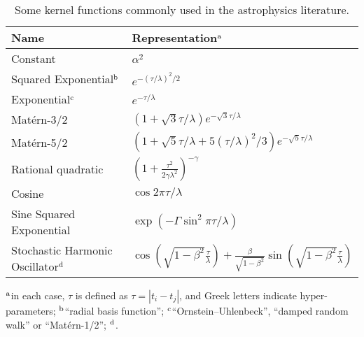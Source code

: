 \documentclass[letterpaper]{ar-1col}
\newcommand{\dt}{\ensuremath{\tau}}
\newcommand{\amplitude}{\ensuremath{\alpha}}
\newcommand{\lengthscale}{\ensuremath{\lambda}}
\begin{document}
\begin{table}[ht]
  \caption{Some kernel functions commonly used in the astrophysics literature. }
  \label{tab:kernels}
  \begin{center}
    \begin{tabular}{@{}l|l@{}}
      \hline
      Name                           &  Representation$^{\rm a}$                                    \\
      \hline
      Constant                       & $\amplitude^2$                                                     \\
      Squared Exponential$^{\rm b}$  & $e^{-(\dt/\lengthscale)^2/2}$                                              \\
      Exponential$^{\rm c}$          & $e^{-\dt/\lengthscale}$                                                  \\
      Mat\'ern-3/2                   & $\left(1 + \sqrt{3}\dt/\lengthscale\right)e^{-\sqrt{3}\dt/\lengthscale}$             \\
      Mat\'ern-5/2                   & $\left(1 + \sqrt{5}\dt/\lengthscale +5(\dt/\lengthscale)^2/3\right)e^{-\sqrt{5}\dt/\lengthscale}$  \\
      Rational quadratic             & $\left( 1 + \frac{\dt^2}{2 \gamma\lengthscale^2} \right)^{-\gamma}$ \\
      Cosine                         & $\cos 2\pi\dt/\lengthscale$                                                  \\
      Sine Squared Exponential       & $\exp\left(-\Gamma\sin^2\pi\dt/\lengthscale\right)$                      \\
      Stochastic Harmonic Oscillator$^{\rm d}$ & $\cos\left(\sqrt{1-\beta^2}\frac{\dt}{\lengthscale}\right) + \frac{\beta}{\sqrt{1-\beta^2}}\sin\left(\sqrt{1-\beta^2}\frac{\dt}{\lengthscale}\right)$                          \\
      \hline
    \end{tabular}
  \end{center}
  \begin{tabnote}
    $^{\rm a}$in each case, $\dt$ is defined as $\dt = \left|t_i - t_j\right|$, and Greek letters indicate hyper-parameters;
    $^{\rm b}$``radial basis function'';
    $^{\rm c}$``Ornstein--Uhlenbeck'', ``damped random walk'' or ``Mat\'ern-1/2'';
    $^{\rm d}$\citet{celerite}.
  \end{tabnote}
\end{table}
\end{document}
